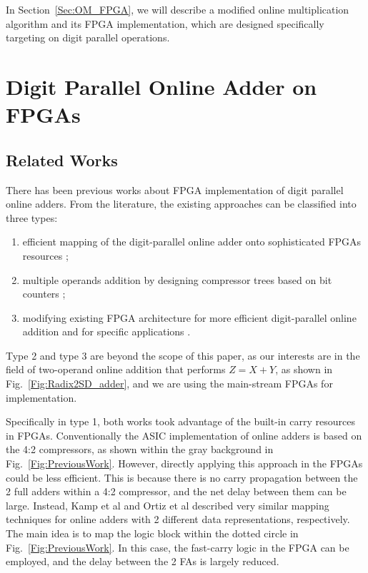 \documentclass[conference]{IEEEtran}
\begin{document}
In Section~\ref{Sec:OM_FPGA}, we will describe a modified online multiplication algorithm and its FPGA implementation, which are designed specifically targeting on digit parallel operations.



\section{Digit Parallel Online Adder on FPGAs}\label{Sec:OA_FPGA}
\subsection{Related Works}
There has been previous works about FPGA implementation of digit parallel online adders. From the literature, the existing approaches can be classified into three types:

\begin{enumerate}
    \item efficient mapping of the digit-parallel online adder onto sophisticated FPGAs resources \cite{FPT09RA,ASAP09RA};
    \item multiple operands addition by designing compressor trees based on bit counters \cite{TC13RA,ASPDAC10RA_FPGA};
    \item modifying existing FPGA architecture for more efficient digit-parallel online addition \cite{DAC07_CounterTree} and for specific applications \cite{FPL09_onlineCCM}.
\end{enumerate}

Type 2 and type 3 are beyond the scope of this paper, as our interests are in the field of two-operand online addition that performs $Z=X+Y$, as shown in Fig.~\ref{Fig:Radix2SD_adder}, and we are using the main-stream FPGAs for implementation. 

Specifically in type 1, both works took advantage of the built-in carry resources in FPGAs. Conventionally the ASIC implementation of online adders is based on the 4:2 compressors, as shown within the gray background in Fig.~\ref{Fig:PreviousWork}. However, directly applying this approach in the FPGAs could be less efficient. This is because there is no carry propagation between the 2 full adders within a 4:2 compressor, and the net delay between them can be large. Instead, Kamp et al and Ortiz et al described very similar mapping techniques for online adders with 2 different data representations, respectively. The main idea is to map the logic block within the dotted circle in Fig.~\ref{Fig:PreviousWork}. In this case, the fast-carry logic in the FPGA can be employed, and the delay between the 2 FAs is largely reduced.
\end{document}
